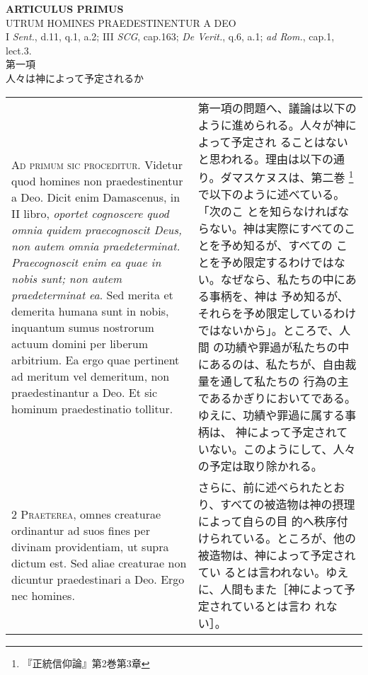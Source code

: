 \documentclass[10pt]{jsarticle} %
\begin{document}
\newpage


\begin{center}
 {\Large {\bf ARTICULUS PRIMUS}}\\
 {\large UTRUM HOMINES PRAEDESTINENTUR A DEO}\\
 {\footnotesize I {\itshape Sent.}, d.11, q.1, a.2; III {\itshape SCG},
 cap.163; {\itshape De Verit.}, q.6, a.1; {\itshape ad Rom.}, cap.1, lect.3.}\\
 {\Large 第一項\\人々は神によって予定されるか}
\end{center}

\begin{longtable}{p{21em}p{21em}}



{\Huge A}{\scshape d primum sic proceditur}. Videtur quod
homines non praedestinentur a Deo. Dicit enim Damascenus, in II libro,
{\itshape oportet cognoscere quod omnia quidem praecognoscit Deus, non autem omnia
praedeterminat. Praecognoscit enim ea quae in nobis sunt; non autem
praedeterminat ea}. Sed merita et demerita humana sunt in nobis,
inquantum sumus nostrorum actuum domini per liberum arbitrium. Ea ergo
quae pertinent ad meritum vel demeritum, non praedestinantur a Deo. Et
sic hominum praedestinatio tollitur.


 
&

第一項の問題へ、議論は以下のように進められる。人々が神によって予定され
ることはないと思われる。理由は以下の通り。ダマスケヌスは、第二巻
\footnote{『正統信仰論』第2巻第3章}で以下のように述べている。「次のこ
とを知らなければならない。神は実際にすべてのことを予め知るが、すべての
ことを予め限定するわけではない。なぜなら、私たちの中にある事柄を、神は
予め知るが、それらを予め限定しているわけではないから」。ところで、人間
の功績や罪過が私たちの中にあるのは、私たちが、自由裁量を通して私たちの
行為の主であるかぎりにおいてである。ゆえに、功績や罪過に属する事柄は、
神によって予定されていない。このようにして、人々の予定は取り除かれる。
 

\\


{\scshape 2 Praeterea}, omnes creaturae ordinantur ad
suos fines per divinam providentiam, ut supra dictum est. Sed aliae
creaturae non dicuntur praedestinari a Deo. Ergo nec homines.


 
&

さらに、前に述べられたとおり、すべての被造物は神の摂理によって自らの目
的へ秩序付けられている。ところが、他の被造物は、神によって予定されてい
るとは言われない。ゆえに、人間もまた［神によって予定されているとは言わ
れない］。
 


\end{longtable}
\end{document}
